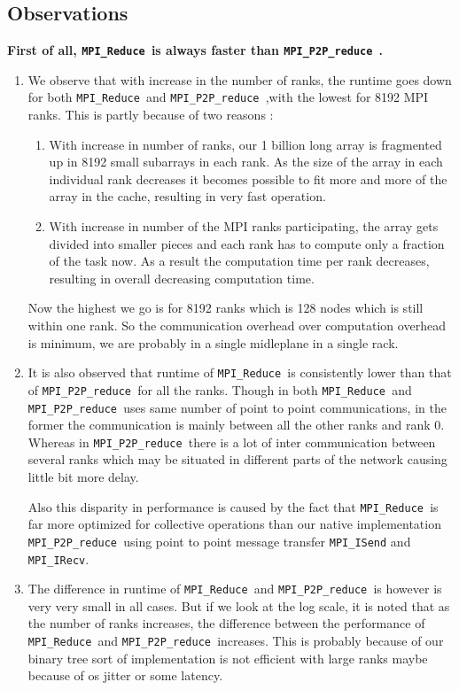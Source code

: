 \documentclass[a4paper,12 pt]{article}
\newcommand{\mpi}{\texttt{MPI\_Reduce }}
\newcommand{\pp}{\texttt{MPI\_P2P\_reduce }}
\begin{document}
\subsection{Observations}
\textbf{First of all, \mpi is always faster than \pp.}

\begin{enumerate}
\item We observe that with increase in the number of ranks, the runtime goes down for both \mpi and \pp,with the lowest for 8192 MPI ranks. This is partly because of two reasons :
\begin{enumerate}
\item With increase in number of ranks, our 1 billion long array is fragmented up in 8192 small subarrays in each rank. As the size of the array in each individual rank decreases it becomes possible to fit more and more of the array in the cache, resulting in very fast operation.

\item With increase in number of the MPI ranks participating, the array gets divided into smaller pieces and each rank has to compute only a fraction of the task now. As a result the computation time per rank decreases, resulting in overall decreasing computation time.
\end{enumerate}
Now the highest we go is for 8192 ranks which is 128 nodes which is still within one rank. So the communication overhead over computation overhead is minimum, we are probably in a single midleplane in a single rack.

\item It is also observed that runtime of \mpi is consistently lower than that of \pp for all the ranks. Though in both \mpi and \pp uses same number of point to point communications, in the former the communication is mainly between all the other ranks and rank 0. Whereas in \pp there is a lot of inter communication between several ranks which may be situated in different parts of the network causing little bit more delay. 

Also this disparity in performance is caused by the fact that \mpi is far more optimized for collective operations than our native implementation \pp using point to point message transfer \texttt{MPI\_ISend} and \texttt{MPI\_IRecv}. 

\item The difference in runtime of \mpi and \pp is however is very very small in all cases. But if we look at the log scale, it is noted that as the number of ranks increases, the difference between the performance of \mpi and \pp increases. This is probably because of our binary tree sort of implementation is not efficient with large ranks maybe because of os jitter or some latency. 

\end{enumerate}
\end{document}
